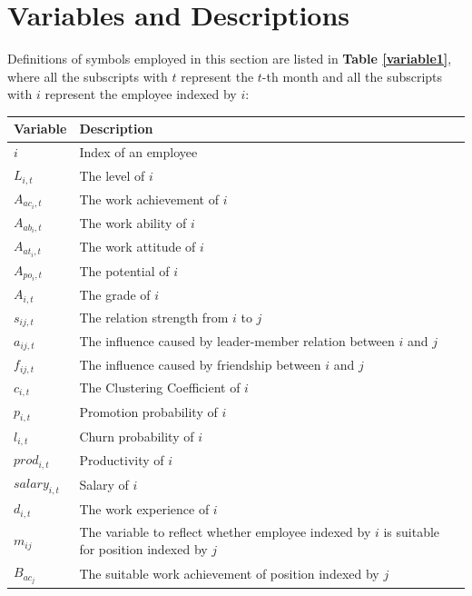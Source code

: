 \documentclass[12pt,a4paper,titlepage]{article}
\begin{document}
\section{Variables and Descriptions}

Definitions of symbols employed in this section are listed in \textbf{Table
\ref{variable1}}, where all the subscripts with $t$ represent the
$t$-th month and all the subscripts with $i$ represent the employee
indexed by $i$:

\begin{table}
  \centering
  \begin{tabular}{l p{10cm}}
  \toprule[2pt]
  Variable & Description \\
  \midrule{}
  $i$            &Index of an employee \\
  $L_{i,t}$          &The level of $i$ \\
  $A_{ac_i,t}$       &The work achievement of $i$ \\
  $A_{ab_i,t}$         &The work ability of $i$ \\
  $A_{at_i,t}$        &The work attitude of $i$ \\
  $A_{po_i,t}$       &The potential of $i$ \\
  $A_{i,t}$          &The grade of $i$ \\
  $s_{ij,t}$        &The relation strength from $i$ to $j$ \\
  $a_{ij,t}$        &The influence caused by leader-member relation
                    between $i$ and $j$ \\
  $f_{ij,t}$        &The influence caused by friendship
                    between $i$ and $j$\\
  $c_{i,t}$        &The Clustering Coefficient of $i$ \\
  $p_{i,t}$           &Promotion probability of $i$\\
  $l_{i,t}$          &Churn probability of $i$ \\
  $prod_{i,t}$       &Productivity of $i$ \\
  $salary_{i,t}$     &Salary of $i$ \\
  $d_{i,t}$          &The work experience of $i$ \\
  $m_{ij}$           &The variable to reflect whether employee indexed
                       by $i$ is suitable for position indexed by $j$
                       \\
  $B_{ac_j}$       &The suitable work achievement of position indexed
                     by  $j$ \\

\end{tabular}
\end{table}
\end{document}
